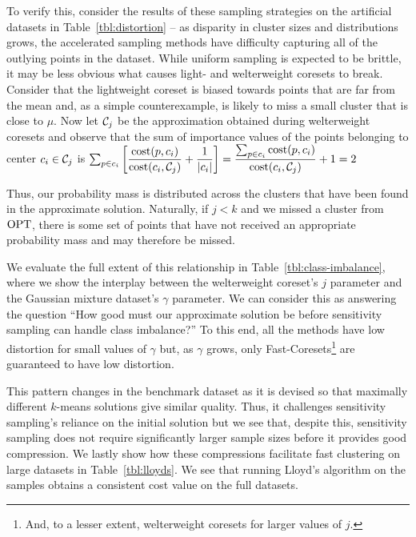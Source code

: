 To verify this, consider the results of these sampling strategies on the artificial datasets in Table~\ref{tbl:distortion} -- as disparity in cluster sizes and
distributions grows, the accelerated sampling methods have difficulty capturing all of the outlying points in the dataset.  While uniform sampling is expected
to be brittle, it may be less obvious what causes light- and welterweight coresets to break. Consider that the lightweight coreset is biased towards points that
are far from the mean and, as a simple counterexample, is likely to miss a small cluster that is close to $\mu$.  Now let $\mathcal C_j$ be the approximation
obtained during welterweight coresets and observe that the sum of importance values of the points belonging to center $c_i \in \mathcal C_j$ is
$\sum_{p \in c_i} \left[ \dfrac{\operatorname{cost}(p, c_i)}{\operatorname{cost}(c_i, \mathcal C_j)} + \dfrac{1}{|c_i|} \right] = \dfrac{\sum_{p \in c_i} \operatorname{cost}(p,
    c_i)}{\operatorname{cost}(c_i, \mathcal C_j)} + 1 = 2$

Thus, our probability mass is distributed across the clusters that have been found in the approximate solution. Naturally, if $j < k$ and we missed a cluster
from $\text{OPT}$, there is some set of points that have not received an appropriate probability mass and may therefore be missed.

We evaluate the full extent of this relationship in Table~\ref{tbl:class-imbalance}, where we show the interplay between the welterweight coreset's $j$
parameter and the Gaussian mixture dataset's $\gamma$ parameter. We can consider this as answering the question ``How good must our approximate solution be
before sensitivity sampling can handle class imbalance?'' To this end, all the methods have low distortion for small values of $\gamma$ but, as $\gamma$ grows,
only Fast-Coresets\footnote{And, to a lesser extent, welterweight coresets for larger values of $j$.} are guaranteed to have low distortion.

This pattern changes in the benchmark dataset as it is devised so that maximally different $k$-means solutions give similar quality. Thus, it challenges
sensitivity sampling's reliance on the initial solution but we see that, despite this, sensitivity sampling does not require significantly larger sample sizes
before it provides good compression. We lastly show how these compressions facilitate fast clustering on large datasets in Table~\ref{tbl:lloyds}. We see that
running Lloyd's algorithm on the samples obtains a consistent cost value on the full datasets.

%
%

